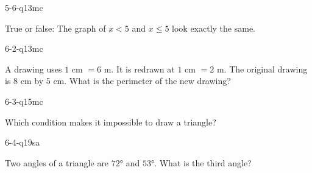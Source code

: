 \begin{practiceQuestion}{5-6-q13}{mc}
\begin{questionText}
True or false: The graph of $x < 5$ and $x \leq 5$ look exactly the same.
\end{questionText}
\end{practiceQuestion}

\begin{practiceQuestion}{6-2-q13}{mc}
\begin{questionText}
A drawing uses $1$ cm $= 6$ m. It is redrawn at $1$ cm $= 2$ m. The original drawing is $8$ cm by $5$ cm. What is the perimeter of the new drawing?
\end{questionText}
\end{practiceQuestion}

\begin{practiceQuestion}{6-3-q15}{mc}
\begin{questionText}
Which condition makes it impossible to draw a triangle?
\end{questionText}
\end{practiceQuestion}

\begin{practiceQuestion}{6-4-q19}{sa}
\begin{questionText}
Two angles of a triangle are $72°$ and $53°$. What is the third angle?
\end{questionText}
\end{practiceQuestion}

